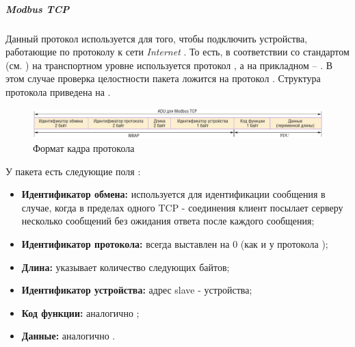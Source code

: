 \subparagraph{Modbus TCP}
Данный протокол используется для того, чтобы подключить устройства, работающие по протоколу \mb к сети \textit{Internet} \cite{__2018-1}. То есть, в соответствии со стандартом \osi (см. ) на транспортном уровне используется протокол \tcp, а на прикладном -- \mb. В этом случае проверка целостности пакета ложится на протокол \tcp. Структура протокола \mb \tcp приведена на . 
\begin{figure}
	\centering
	\includegraphics[width=1\linewidth]{images/modbus_TCP}
	\caption{Формат кадра протокола \mb \tcp}
	\label{fig:modbustcp}
\end{figure}
У пакета есть следующие поля \cite{__2010}:
\begin{itemize}
	\item \textbf{Идентификатор обмена:} используется для идентификации сообщения в случае,	когда в пределах одного TCP - соединения клиент посылает серверу несколько сообщений без ожидания ответа после каждого сообщения;
	\item \textbf{Идентификатор протокола:} всегда выставлен на 0 (как и у протокола \tcp);
	\item \textbf{Длина:} указывает количество следующих байтов;
	\item \textbf{Идентификатор устройства:} адрес slave - устройства;
	\item \textbf{Код функции:} аналогично ;
	\item \textbf{Данные:} аналогично .
\end{itemize}

